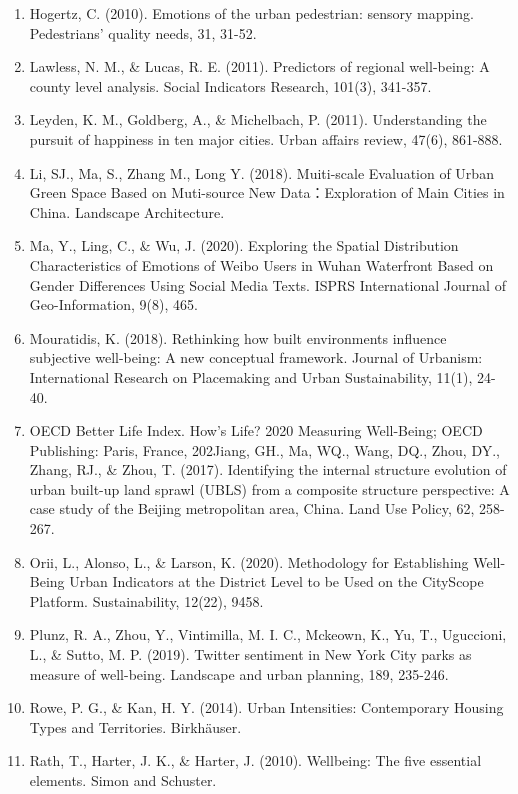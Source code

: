 \documentclass[
]{article}
\begin{document}
\begin{enumerate}
\item
  Hogertz, C. (2010). Emotions of the urban pedestrian: sensory mapping.
  Pedestrians' quality needs, 31, 31-52.
\item
  Lawless, N. M., \& Lucas, R. E. (2011). Predictors of regional
  well-being: A county level analysis. Social Indicators Research,
  101(3), 341-357.
\item
  Leyden, K. M., Goldberg, A., \& Michelbach, P. (2011). Understanding
  the pursuit of happiness in ten major cities. Urban affairs review,
  47(6), 861-888.
\item
  Li, SJ., Ma, S., Zhang M., Long Y. (2018). Muiti-scale Evaluation of
  Urban Green Space Based on Muti-source New Data：Exploration of Main
  Cities in China. Landscape Architecture.
\item
  Ma, Y., Ling, C., \& Wu, J. (2020). Exploring the Spatial Distribution
  Characteristics of Emotions of Weibo Users in Wuhan Waterfront Based
  on Gender Differences Using Social Media Texts. ISPRS International
  Journal of Geo-Information, 9(8), 465.
\item
  Mouratidis, K. (2018). Rethinking how built environments influence
  subjective well-being: A new conceptual framework. Journal of
  Urbanism: International Research on Placemaking and Urban
  Sustainability, 11(1), 24-40.
\item
  OECD Better Life Index. How's Life? 2020 Measuring Well-Being; OECD
  Publishing: Paris, France, 202Jiang, GH., Ma, WQ., Wang, DQ., Zhou,
  DY., Zhang, RJ., \& Zhou, T. (2017). Identifying the internal
  structure evolution of urban built-up land sprawl (UBLS) from a
  composite structure perspective: A case study of the Beijing
  metropolitan area, China. Land Use Policy, 62, 258-267.
\item
  Orii, L., Alonso, L., \& Larson, K. (2020). Methodology for
  Establishing Well-Being Urban Indicators at the District Level to be
  Used on the CityScope Platform. Sustainability, 12(22), 9458.
\item
  Plunz, R. A., Zhou, Y., Vintimilla, M. I. C., Mckeown, K., Yu, T.,
  Uguccioni, L., \& Sutto, M. P. (2019). Twitter sentiment in New York
  City parks as measure of well-being. Landscape and urban planning,
  189, 235-246.
\item
  Rowe, P. G., \& Kan, H. Y. (2014). Urban Intensities: Contemporary
  Housing Types and Territories. Birkhäuser.
\item
  Rath, T., Harter, J. K., \& Harter, J. (2010). Wellbeing: The five
  essential elements. Simon and Schuster.

\end{enumerate}
\end{document}
